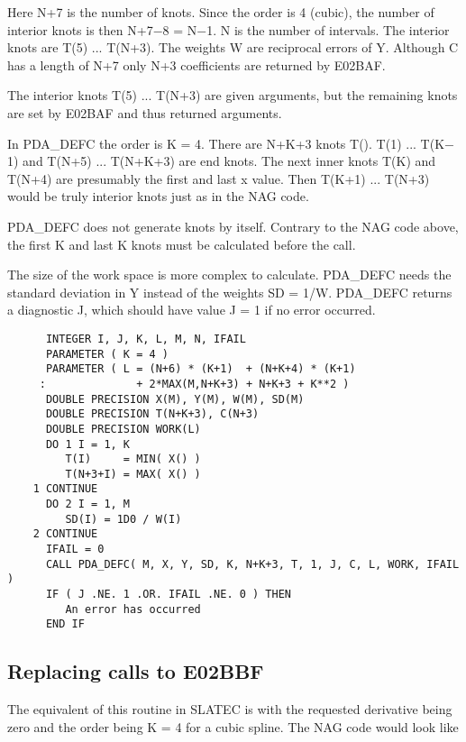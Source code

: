    Here N+7 is the number of knots. Since the order is 4 (cubic), the
   number of interior knots is then N+7$-$8 = N$-$1. N is the number of
   intervals. The interior knots are T(5) ... T(N+3). The weights W are
   reciprocal errors of Y. Although C has a length of N+7 only N+3
   coefficients are returned by E02BAF.

   The interior knots T(5) ... T(N+3) are given arguments, but the
   remaining knots are set by E02BAF and thus returned arguments.

   In PDA\_DEFC the order is K = 4. There are N+K+3 knots T(). T(1) ...
   T(K$-$1) and T(N+5) ... T(N+K+3) are end knots. The next
   inner knots T(K) and T(N+4) are presumably the first and last x
   value. Then T(K+1) ... T(N+3) would be truly interior knots just as
   in the NAG code.

   PDA\_DEFC does not generate knots by itself. Contrary to the NAG code
   above, the first K and last K knots must be calculated before the
   call.

   The size of the work space is more complex to calculate. PDA\_DEFC needs
   the standard deviation in Y instead of the weights SD = 1/W. PDA\_DEFC
   returns a diagnostic J, which should have value J = 1 if no error
   occurred.

\begin{verbatim}
      INTEGER I, J, K, L, M, N, IFAIL
      PARAMETER ( K = 4 )
      PARAMETER ( L = (N+6) * (K+1)  + (N+K+4) * (K+1)
     :              + 2*MAX(M,N+K+3) + N+K+3 + K**2 )
      DOUBLE PRECISION X(M), Y(M), W(M), SD(M)
      DOUBLE PRECISION T(N+K+3), C(N+3)
      DOUBLE PRECISION WORK(L)
      DO 1 I = 1, K
         T(I)     = MIN( X() )
         T(N+3+I) = MAX( X() )
    1 CONTINUE
      DO 2 I = 1, M
         SD(I) = 1D0 / W(I)
    2 CONTINUE
      IFAIL = 0
      CALL PDA_DEFC( M, X, Y, SD, K, N+K+3, T, 1, J, C, L, WORK, IFAIL )
      IF ( J .NE. 1 .OR. IFAIL .NE. 0 ) THEN
         An error has occurred
      END IF
\end{verbatim}


\subsection{Replacing calls to E02BBF}

   The equivalent of this routine in SLATEC is
   with the requested
   derivative being zero and the order being K = 4 for a cubic spline.
   The NAG code would look like

